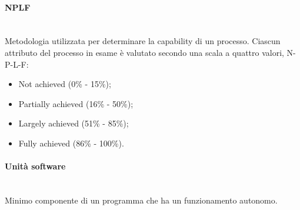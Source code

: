 \paragraph{NPLF}~\smallskip \\
Metodologia utilizzata per determinare la capability di un processo. Ciascun attributo del processo in esame è valutato secondo una scala a quattro valori, N-P-L-F:
\begin{itemize}
	\item Not achieved (0\% - 15\%);
	\item Partially achieved (16\% - 50\%);
	\item Largely achieved (51\% - 85\%);
    \item Fully achieved (86\% - 100\%).
\end{itemize}

\paragraph{Unità software}~\smallskip \\
Minimo componente di un programma che ha un funzionamento autonomo.
